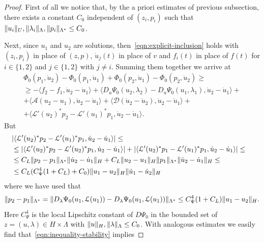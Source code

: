 \documentclass[a4paper,10pt,oneside]{amsbook}
\numberwithin{section}{chapter}
\numberwithin{equation}{chapter}
\theoremstyle{definition}
\DeclarePairedDelimiter{\norm}{\lVert}{\rVert}
\begin{document}
\begin{proof}
First of all we notice that, by the a priori estimates of previous subsection, there exists a constant $C_0$ independent of $(z_i,p_i)$ such that $\norm{u_i}_U,\norm{\lambda_i}_\Lambda,\norm{p_i}_{\Lambda^*}\le C_0$.

Next, since $u_1$ and $u_2$ are solutions, then~\eqref{eqn:explicit-inclusion} holds with $(z_i,p_i)$ in place of $(z,p)$, $\dot u_j(t)$ in place of $v$ and $f_i(t)$ in place of $f(t)$ for $i\in\{1,2\}$ and $j\in\{1,2\}$ with $j\neq i$. Summing them together we arrive at
\begin{equation}
\label{eqn:inequality-stability}
\begin{multlined}
\Phi_0(p_1,\dot{u}_2)-\Phi_0(p_1,\dot{u}_1)+\Phi_0(p_2,\dot{u}_1)-\Phi_0(p_2,\dot{u}_2)\ge\\
\ge-\langle f_2-f_1,\dot{u}_2-\dot{u}_1\rangle+\langle D_u\Psi_0({u}_2,\lambda_2)-D_u\Psi_0({u}_1,\lambda_1),\dot{u}_2-\dot{u}_1\rangle+\\
+\langle \mathcal A(u_2-u_1),\dot{u}_2-\dot{u}_1\rangle+\langle \mathcal D(\dot{u}_2-\dot{u}_2),\dot{u}_2-\dot{u}_1\rangle+\\
+\langle\mathcal{L}'(u_2)^*p_2-\mathcal{L}'(u_1)^*p_1,\dot{u}_2-\dot{u}_1\rangle.
\end{multlined}
\end{equation}
But
\[
\begin{multlined}
|\langle\mathcal{L}'(u_2)^*p_2-\mathcal{L}'(u_1)^*p_1,\dot{u}_2-\dot{u}_1\rangle|\le\\
\begin{split}
&\le|\langle\mathcal{L}'(u_2)^*p_2-\mathcal{L}'(u_2)^*p_1,\dot{u}_2-\dot{u}_1\rangle|+|\langle\mathcal{L}'(u_2)^*p_1-\mathcal{L}'(u_1)^*p_1,\dot{u}_2-\dot{u}_1\rangle|\le\\
&\le C_L\norm{p_2-p_1}_{\Lambda^*}\norm{\dot u_2-\dot u_1}_H+C_L\norm{u_2-u_1}_H\norm{p_1}_{\Lambda^*}\norm{\dot u_2-\dot u_1}_H\le\\
&\le C_L(C_\Psi^4(1+C_L)+C_0)\norm{u_1-u_2}_H\norm{\dot u_1-\dot u_2}_H
\end{split}
\end{multlined}
\]
where we have used that
\[
\norm{p_2-p_1}_{\Lambda^*}=\norm{D_\lambda\Psi_0(u_1,\mathcal{L}(u_1))-D_\lambda\Psi_0(u_1,\mathcal{L}(u_1))}_{\Lambda^*}\le C_\Psi^4(1+C_L)\norm{u_1-u_2}_H.
\]
Here $C_\Psi^4$ is the local Lipschitz constant of $D\Psi_0$ in the bounded set of $z=(u,\lambda)\in H\times\Lambda$ with $\norm{u}_H,\norm{\lambda}_\Lambda\le C_0$. With analogous estimates we easily find that~\eqref{eqn:inequality-stability} implies

\end{proof}
\end{document}
